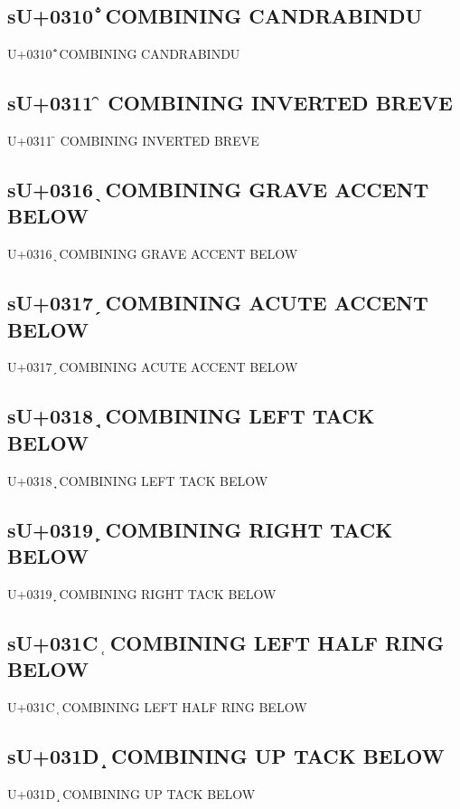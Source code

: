 \subsection{sU+0310 ̐ COMBINING CANDRABINDU}

U+0310 ̐ COMBINING CANDRABINDU

\subsection{sU+0311 ̑ COMBINING INVERTED BREVE}

U+0311 ̑ COMBINING INVERTED BREVE

\subsection{sU+0316 ̖ COMBINING GRAVE ACCENT BELOW}

U+0316 ̖ COMBINING GRAVE ACCENT BELOW

\subsection{sU+0317 ̗ COMBINING ACUTE ACCENT BELOW}

U+0317 ̗ COMBINING ACUTE ACCENT BELOW

\subsection{sU+0318 ̘ COMBINING LEFT TACK BELOW}

U+0318 ̘ COMBINING LEFT TACK BELOW

\subsection{sU+0319 ̙ COMBINING RIGHT TACK BELOW}

U+0319 ̙ COMBINING RIGHT TACK BELOW

\subsection{sU+031C ̜ COMBINING LEFT HALF RING BELOW}

U+031C ̜ COMBINING LEFT HALF RING BELOW

\subsection{sU+031D ̝ COMBINING UP TACK BELOW}

U+031D ̝ COMBINING UP TACK BELOW


